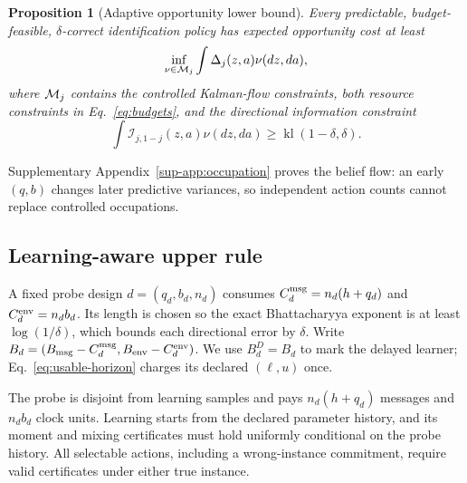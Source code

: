 \documentclass[journal]{IEEEtran}
\newtheorem{proposition}{Proposition}
\begin{document}
\begin{proposition}[Adaptive opportunity lower bound]
Every predictable, budget-feasible, $\delta$-correct identification policy has expected opportunity cost at least
\begin{equation}
\inf_{\nu\in{\cal M}_j}
\int\Delta_j(z,a)\nu(dz,da),
\label{eq:occupation-lower-bound}
\end{equation}
where ${\cal M}_j$ contains the controlled Kalman-flow constraints, both resource constraints in Eq.~\eqref{eq:budgets}, and the directional information constraint
\begin{equation}
\int\mathcal I_{j,1-j}(z,a)\nu(dz,da)
\ge\operatorname{kl}(1-\delta,\delta).
\label{eq:occupation-information}
\end{equation}
\label{prop:occupation}
\end{proposition}

Supplementary Appendix~\ref{sup-app:occupation} proves the belief flow: an early $(q,b)$ changes later predictive variances, so independent action counts cannot replace controlled occupations.

\subsection{Learning-aware upper rule}
A fixed probe design $d=(q_d,b_d,n_d)$ consumes $C_d^{\rm msg}=n_d(h+q_d)$ and $C_d^{\rm env}=n_db_d$.
Its length is chosen so the exact Bhattacharyya exponent is at least $\log(1/\delta)$, which bounds each directional error by $\delta$.
Write $B_d=(B_{\rm msg}-C_d^{\rm msg},B_{\rm env}-C_d^{\rm env})$.
We use $B_d^D=B_d$ to mark the delayed learner; Eq.~\eqref{eq:usable-horizon} charges its declared $(\ell,u)$ once.

The probe is disjoint from learning samples and pays $n_d(h+q_d)$ messages and $n_db_d$ clock units.
Learning starts from the declared parameter history, and its moment and mixing certificates must hold uniformly conditional on the probe history.
All selectable actions, including a wrong-instance commitment, require valid certificates under either true instance.
\end{document}
